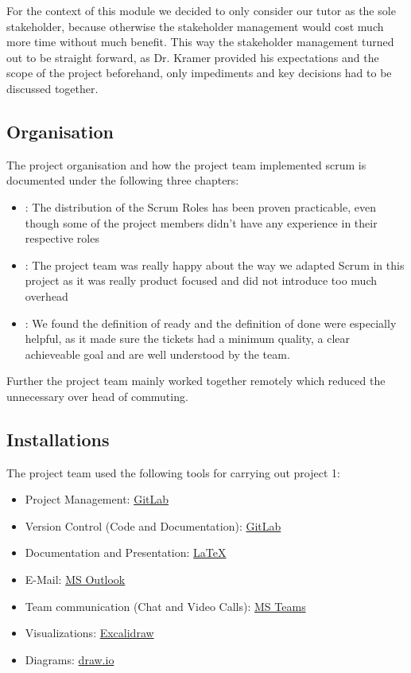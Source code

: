 For the context of this module we decided to only consider our tutor as the sole stakeholder,
because otherwise the stakeholder management would cost much more time without much benefit.
This way the stakeholder management turned out to be straight forward, as Dr. Kramer provided his expectations and the
scope of the project beforehand, only impediments and key decisions had to be discussed together.

\subsection{Organisation}\label{subsec:organisation}
The project organisation and how the project team implemented scrum is documented under the following three chapters:

\begin{itemize}
    \item {}: The distribution of the Scrum Roles has been proven practicable, even though some of the project members didn't have any experience in their respective roles
    \item {}: The project team was really happy about the way we adapted Scrum in this project as it was really product focused and did not introduce too much overhead
    \item {}: We found the definition of ready and the definition of done were especially helpful, as it made sure the tickets had a minimum quality, a clear achieveable goal and are well understood by the team.
\end{itemize}

Further the project team mainly worked together remotely which reduced the unnecessary over head of commuting.

\subsection{Installations}\label{subsec:installations}
The project team used the following tools for carrying out project 1:
\begin{itemize}
    \item Project Management: \href{https://about.gitlab.com/}{GitLab}
    \item Version Control (Code and Documentation): \href{https://about.gitlab.com/}{GitLab}
    \item Documentation and Presentation: \href{https://www.latex-project.org/}{LaTeX}
    \item E-Mail: \href{https://www.microsoft.com/en-us/microsoft-365/outlook/email-and-calendar-software-microsoft-outlook}{MS Outlook}
    \item Team communication (Chat and Video Calls): \href{https://www.microsoft.com/en-us/microsoft-teams/group-chat-software}{MS Teams}
    \item Visualizations: \href{https://excalidraw.com/}{Excalidraw}
    \item Diagrams: \href{https://www.drawio.com/}{draw.io}
\end{itemize}
